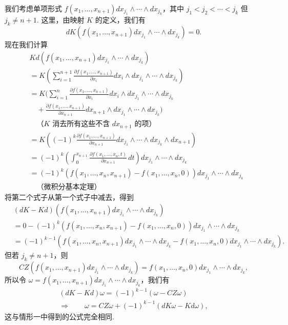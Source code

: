 我们考虑单项形式 $f(x_1,\ldots,x_{n+1})dx_{j_1}\wedge\cdots\wedge dx_{j_k}$，其中 $j_1<j_2<\cdots<j_k$ 但 $j_k\neq n+1$. 这里，由映射 $K$ 的定义，我们有
\[
dK\left(f(x_1,\ldots,x_{n+1})dx_{j_1}\wedge\cdots\wedge dx_{j_k}\right)=0.
\]
现在我们计算
\[
\begin{aligned}
&Kd\left(f(x_1,\ldots,x_{n+1})dx_{j_1}\wedge\cdots\wedge dx_{j_k}\right)\\
&= K\left(\sum_{i=1}^{n+1}\frac{\partial f(x_1,\ldots,x_{n+1})}{\partial x_i}dx_i\wedge dx_{j_1}\wedge\cdots\wedge dx_{j_k}\right)\\
&= K\Biggl(\sum_{i=1}^{n}\frac{\partial f(x_1,\ldots,x_{n+1})}{\partial x_i}dx_i\wedge dx_{j_1}\wedge\cdots\wedge dx_{j_k}\\
&\quad+\frac{\partial f(x_1,\ldots,x_{n+1})}{\partial x_{n+1}}dx_{n+1}\wedge dx_{j_1}\wedge\cdots\wedge dx_{j_k}\Biggr)\\
&\quad\text{（}K\text{ 消去所有这些不含 }dx_{n+1}\text{ 的项）}\\
&= K\left((-1)^k\frac{\partial f(x_1,\ldots,x_{n+1})}{\partial x_{n+1}}dx_{j_1}\wedge\cdots\wedge dx_{j_k}\wedge dx_{n+1}\right)\\
&= (-1)^k\left(\int_0^{x_{n+1}}\frac{\partial f(x_1,\ldots,x_n,t)}{\partial x_{n+1}}\,dt\right)dx_{j_1}\wedge\cdots\wedge dx_{j_k}\\
&= (-1)^k\left(f(x_1,\ldots,x_n,x_{n+1})-f(x_1,\ldots,x_n,0)\right)dx_{j_1}\wedge\cdots\wedge dx_{j_k}\\
&\quad\text{（微积分基本定理）}
\end{aligned}
\]
将第二个式子从第一个式子中减去，得到
\[
\begin{aligned}
&(dK-Kd)\left(f(x_1,\ldots,x_{n+1})dx_{j_1}\wedge\cdots\wedge dx_{j_k}\right)\\
&= 0-(-1)^k\left(f(x_1,\ldots,x_n,x_{n+1})-f(x_1,\ldots,x_n,0)\right)dx_{j_1}\wedge\cdots\wedge dx_{j_k}\\
&= (-1)^{k-1}\left(f(x_1,\ldots,x_n,x_{n+1})dx_{j_1}\wedge\cdots\wedge dx_{j_k}-f(x_1,\ldots,x_n,0)dx_{j_1}\wedge\cdots\wedge dx_{j_k}\right).
\end{aligned}
\]
但若 $j_k\neq n+1$，则
\[
CZ\left(f(x_1,\ldots,x_{n+1})dx_{j_1}\wedge\cdots\wedge dx_{j_k}\right)=f(x_1,\ldots,x_n,0)dx_{j_1}\wedge\cdots\wedge dx_{j_k},
\]
所以令 $\omega=f(x_1,\ldots,x_{n+1})dx_{j_1}\wedge\cdots\wedge dx_{j_k}$，我们有
\begin{align*}
(dK-Kd)\omega=(-1)^{k-1}\left(\omega-CZ\omega\right) \\
\Rightarrow\qquad \omega=CZ\omega+(-1)^{k-1}\left(dK\omega-Kd\omega\right),
\end{align*}
这与情形一中得到的公式完全相同.

